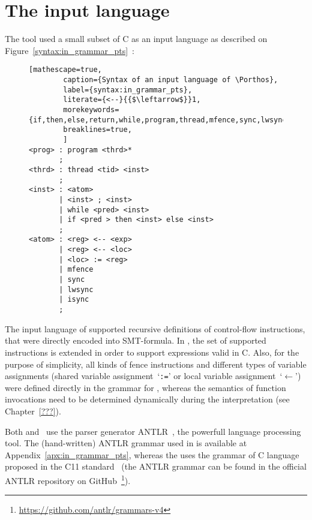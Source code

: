 \chapter{The input language}
\label{ch:impl}

The \Porthos tool used a small subset of C as an input language as described on Figure~\ref{syntax:in_grammar_pts}~\cite{Porthos17}:

\begin{figure}[H]
\begin{lstlisting}[mathescape=true,
        caption={Syntax of an input language of \Porthos},
        label={syntax:in_grammar_pts},
        literate={<--}{{$\leftarrow$}}1,
        morekeywords={if,then,else,return,while,program,thread,mfence,sync,lwsync,isync}
        breaklines=true,
        ]
<prog> : program <thrd>*
       ;
<thrd> : thread <tid> <inst>
       ;
<inst> : <atom> 
       | <inst> ; <inst>
       | while <pred> <inst>
       | if <pred > then <inst> else <inst>
       ;
<atom> : <reg> <-- <exp> 
       | <reg> <-- <loc>
       | <loc> := <reg> 
       | mfence
       | sync
       | lwsync
       | isync
       ;
\end{lstlisting}
\end{figure}


The input language of \Porthos supported recursive definitions of control-flow instructions, that were directly encoded into SMT-formula. In \mousquetaires, the set of supported instructions is extended in order to support expressions valid in C.%
 Also, for the purpose of simplicity, all kinds of fence instructions and different types of variable assignments (shared variable assignment~`\texttt{:=}' or local variable assignment~`$\mathtt{\leftarrow}$') were defined directly in the grammar for \Porthos, whereas the semantics of function invocations need to be determined dynamically during the interpretation
(see Chapter~\ref{???}).

Both \Porthos and \mousquetaires \ use the parser generator ANTLR~\cite{parr2013definitive}, the powerfull language processing tool. The (hand-written) ANTLR grammar used in \Porthos is available at Appendix~\ref{apx:in_grammar_pts}, whereas the \mousquetaires uses the grammar of C language proposed in the C11 standard~\cite{jtc2011sc22} (the ANTLR grammar can be found in the official ANTLR repository on GitHub~\footnote{\url{https://github.com/antlr/grammars-v4}}).
